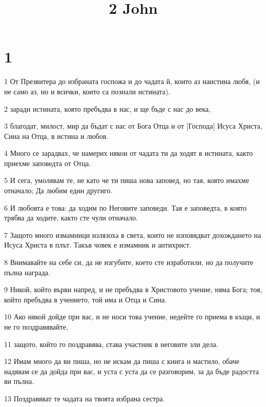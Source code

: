 

\title{2 John}


\chapter{1}

\par 1 От Презвитера до избраната госпожа и до чадата й, които аз наистина любя, (и не само аз, но и всички, които са познали истината).
\par 2 заради истината, която пребъдва в нас, и ще бъде с нас до века,
\par 3 благодат, милост, мир да бъдат с нас от Бога Отца и от [Господа] Исуса Христа, Сина на Отца, в истина и любов.
\par 4 Много се зарадвах, че намерих някои от чадата ти да ходят в истината, както приехме заповедта от Отца.
\par 5 И сега, умолявам те, не като че ти пиша нова заповед, но тая, която имахме отначало; Да любим един другиго.
\par 6 И любовта е това: да ходим по Неговите заповеди. Тая е заповедта, в която трябва да ходите, както сте чули отначало.
\par 7 Защото много измамници излязоха в света, които не изповядват дохождането на Исуса Христа в плът. Такъв човек е измамник и антихрист.
\par 8 Внимавайте на себе си, да не изгубите, което сте изработили, но да получите пълна награда.
\par 9 Никой, който върви напред, и не пребъдва в Христовото учение, няма Бога; тоя, който пребъдва в учението, той има и Отца и Сина.
\par 10 Ако някой дойде при вас, и не носи това учение, недейте го приема в къщи, и не го поздравявайте,
\par 11 защото, който го поздравява, става участник в неговите зли дела.
\par 12 Имам много да ви пиша, но не искам да пиша с книга и мастило, обаче надявам се да дойда при вас, и уста с уста да се разговорим, за да бъде радостта ви пълна.
\par 13 Поздравяват те чадата на твоята избрана сестра.


